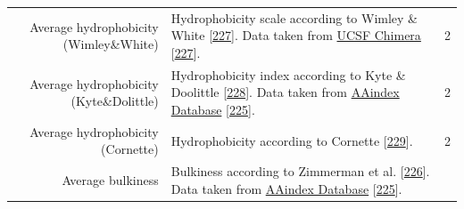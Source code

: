 \documentclass[11pt,a4paper,twoside]{book}
\theoremstyle{definition}
\theoremstyle{definition}
\theoremstyle{remark}
\begin{document}
\begin{longtable}[]{@{}rlc@{}}
\begin{minipage}[t]{0.23\columnwidth}
Average hydrophobicity (Wimley\&White)\strut
\end{minipage} & \begin{minipage}[t]{0.50\columnwidth}\raggedright\strut
Hydrophobicity scale according to Wimley \& White
{[}\protect\hyperlink{ref-Wimley1996}{227}{]}. Data taken from
\href{https://www.cgl.ucsf.edu/chimera/docs/ContributedSoftware/defineattrib/wwHydrophobicity.txt}{UCSF
Chimera} {[}\protect\hyperlink{ref-Wimley1996}{227}{]}.\strut
\end{minipage} & \begin{minipage}[t]{0.18\columnwidth}\centering\strut
2\strut
\end{minipage}\tabularnewline
\begin{minipage}[t]{0.23\columnwidth}\raggedleft\strut
Average hydrophobicity (Kyte\&Dolittle)\strut
\end{minipage} & \begin{minipage}[t]{0.50\columnwidth}\raggedright\strut
Hydrophobicity index according to Kyte \& Doolittle
{[}\protect\hyperlink{ref-Kyte1982}{228}{]}. Data taken from
\href{http://www.genome.jp/dbget-bin/www_bget?aaindex:KYTJ820101}{AAindex
Database} {[}\protect\hyperlink{ref-Kawashima2008}{225}{]}.\strut
\end{minipage} & \begin{minipage}[t]{0.18\columnwidth}\centering\strut
2\strut
\end{minipage}\tabularnewline
\begin{minipage}[t]{0.23\columnwidth}\raggedleft\strut
Average hydrophobicity (Cornette)\strut
\end{minipage} & \begin{minipage}[t]{0.50\columnwidth}\raggedright\strut
Hydrophobicity according to Cornette
{[}\protect\hyperlink{ref-Cornette1987}{229}{]}.\strut
\end{minipage} & \begin{minipage}[t]{0.18\columnwidth}\centering\strut
2\strut
\end{minipage}\tabularnewline
\begin{minipage}[t]{0.23\columnwidth}\raggedleft\strut
Average bulkiness\strut
\end{minipage} & \begin{minipage}[t]{0.50\columnwidth}\raggedright\strut
Bulkiness according to Zimmerman et al.
{[}\protect\hyperlink{ref-Zimmerman1968}{226}{]}. Data taken from
\href{http://www.genome.jp/dbget-bin/www_bget?aaindex:ZIMJ680102}{AAindex
Database} {[}\protect\hyperlink{ref-Kawashima2008}{225}{]}.\strut

\end{minipage}
\end{longtable}
\end{document}
